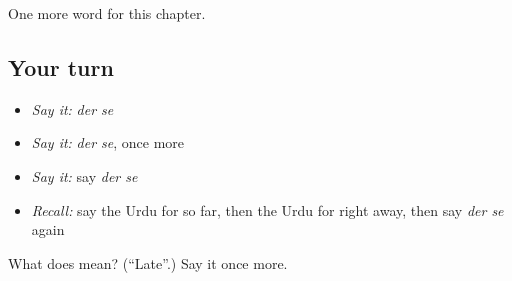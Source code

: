 \begin{grammarlens}[title={What you've built}]
One more word for this chapter.
\end{grammarlens}

\subsection*{Your turn}
\begin{itemize}
\raggedright
  \item \emph{Say it:} \emph{der se}
  \item \emph{Say it:} \emph{der se}, once more
  \item \emph{Say it:} say \emph{der se}
  \item \emph{Recall:} say the Urdu for so far, then the Urdu for right away, then say \emph{der se} again
\end{itemize}

\begin{tcolorbox}[breakable,colback=teal!4,colframe=teal!35!black,title={Before you move on}]
What does   mean? (\textquotedblleft{}Late\textquotedblright{}.) Say it once more.
\end{tcolorbox}
